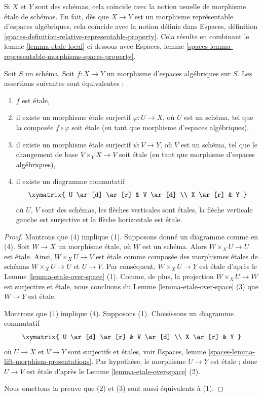 \noindent
Si $X$ et $Y$ sont des schémas, cela coïncide avec la notion usuelle de
morphisme \'etale de schémas. En fait, dès que $X \to Y$ est un morphisme
représentable d'espaces algébriques, cela coïncide avec la notion définie dans
Espaces, définition \ref{spaces-definition-relative-representable-property}.
Cela résulte en combinant le lemme \ref{lemma-etale-local} ci-dessous avec
Espaces, lemme \ref{spaces-lemma-representable-morphisms-spaces-property}.

\begin{lemma}
\label{lemma-etale-local}
Soit $S$ un schéma.
Soit $f : X \to Y$ un morphisme d'espaces algébriques sur $S$.
Les assertions suivantes sont équivalentes :
\begin{enumerate}
\item $f$ est \'etale,
\item il existe un morphisme \'etale surjectif $\varphi : U \to X$,
où $U$ est un schéma, tel que la composée $f \circ \varphi$ soit
\'etale (en tant que morphisme d'espaces algébriques),
\item il existe un morphisme \'etale surjectif $\psi : V \to Y$,
où $V$ est un schéma, tel que le changement de base $V \times_Y X \to V$
soit \'etale (en tant que morphisme d'espaces algébriques),
\item il existe un diagramme commutatif
$$
\xymatrix{
U \ar[d] \ar[r] & V \ar[d] \\
X \ar[r] & Y
}
$$
où $U$, $V$ sont des schémas, les flèches verticales sont \'etales, la
flèche verticale gauche est surjective et la flèche horizontale est \'etale.
\end{enumerate}
\end{lemma}

\begin{proof}
Montrons que (4) implique (1). Supposons donné un diagramme comme en (4).
Soit $W \to X$ un morphisme \'etale, où $W$ est un schéma. Alors
$W \times_X U \to U$ est \'etale. Ainsi, $W \times_X U \to V$ est \'etale
comme composée des morphismes \'etales de schémas $W \times_X U \to U$
et $U \to V$. Par conséquent, $W \times_X U \to Y$ est \'etale d'après le
Lemme \ref{lemma-etale-over-space} (1). Comme, de plus,
la projection $W \times_X U \to W$ est surjective et \'etale, nous concluons
du Lemme \ref{lemma-etale-over-space} (3) que $W \to Y$ est \'etale.

\medskip\noindent
Montrons que (1) implique (4). Supposons (1). Choisissons un diagramme commutatif
$$
\xymatrix{
U \ar[d] \ar[r] & V \ar[d] \\
X \ar[r] & Y
}
$$
où $U \to X$ et $V \to Y$ sont surjectifs et \'etales, voir
Espaces, lemme \ref{spaces-lemma-lift-morphism-presentations}.
Par hypothèse, le morphisme $U \to Y$ est \'etale ;
donc $U \to V$ est \'etale d'après le Lemme \ref{lemma-etale-over-space} (2).

\medskip\noindent
Nous omettons la preuve que (2) et (3) sont aussi équivalents à (1).
\end{proof}

